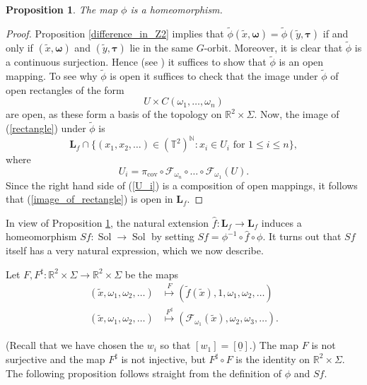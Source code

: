 \documentclass[11pt,letterpaper,reqno]{article}
\newtheorem{proposition}{Proposition}[section]
\newcommand{\N}{\mathbb{N}}
\newcommand{\TT}{\mathbb{T}^2}
\newcommand{\RR}{\mathbb{R}^2}
\newcommand{\hTTf}[1][f]{\mathbf{L}_{#1}}
\newcommand{\cF}{\mathcal{F}}
\newcommand{\tf}{\tilde{f}}
\newcommand{\tx}{\tilde{x}}
\newcommand{\ty}{\tilde{y}}
\newcommand{\bomega}{\boldsymbol{\omega}}
\newcommand{\hf}{\hat{f}}
\newcommand{\pcov}{\pi_{\mathrm{cov}}}
\newcommand{\Sol}{\operatorname{Sol}}
\newcommand{\fsol}{Sf}
\begin{document}
\begin{proposition} \label{phi_is_homeo}
The map  $\phi$ is a homeomorphism. 
\end{proposition}

\begin{proof}
Proposition \ref{difference_in_Z2} implies that $\tilde{\phi}(\tx, \bomega) = \tilde{\phi}(\ty, \boldsymbol{\tau})$ if and only if $(\tx, \bomega)$ and $(\ty, \boldsymbol{\tau})$ lie in the same $G$-orbit. Moreover, it is clear that $\tilde{\phi}$ is a continuous surjection. Hence (see  \cite[Corollary 1.10 and Example 1.5]{Rotman88}) it suffices to show that $\tilde{\phi}$ is an open mapping. To see why $\tilde{\phi}$ is open it suffices to check that the image under $\tilde{\phi}$ of open rectangles of the form
\begin{equation} \label{rectangle}
U \times C(\omega_1, \ldots, \omega_n)
\end{equation}
are open, as these form a basis of the topology on $\RR \times \Sigma$. Now, the image of (\ref{rectangle}) under $\tilde{\phi}$ is 
\begin{equation} \label{image_of_rectangle}
\hTTf \cap \{ (x_1, x_2, \ldots) \in (\TT)^{\N}: x_i \in U_i \text{ for }1\leq i \leq n\},
\end{equation}
where
\begin{equation} \label{U_i}
U_i = \pcov \circ \cF_{\omega_n} \circ \ldots \circ \cF_{\omega_1}(U).
\end{equation}
Since the right hand side of (\ref{U_i}) is a composition of open mappings, it follows that (\ref{image_of_rectangle}) is open in $\hTTf$. 
\end{proof}

In view of Proposition \ref{phi_is_homeo}, the natural extension $\hf : \hTTf \to \hTTf$ induces a homeomorphism $\fsol: \Sol \to \Sol$ by setting $\fsol = \phi^{-1} \circ \hf \circ \phi$. It turns out that $\fsol$ itself has a very natural expression, which we now describe.


Let $F, F^{\sharp}: \RR \times \Sigma \to \RR \times \Sigma$ be the maps 
\begin{align*}
(\tx, \omega_1, \omega_2, \ldots) & \overset{F}{\mapsto} (\tf(\tx), 1, \omega_1, \omega_2, \ldots) \\
(\tx, \omega_1, \omega_2, \ldots) & \overset{F^\sharp}{\mapsto} (\cF_{\omega_1}(\tx), \omega_2, \omega_3, \dots).
\end{align*}

(Recall that we have chosen the $w_i$ so that $[w_1]= [\underline{0}]$.) The map $F$ is not surjective and the map $F^\sharp$ is not injective, but $F^\sharp \circ F$ is the identity on $\RR \times \Sigma$.
The following proposition follows straight from the definition of $\phi$ and $\fsol$.
\end{document}
